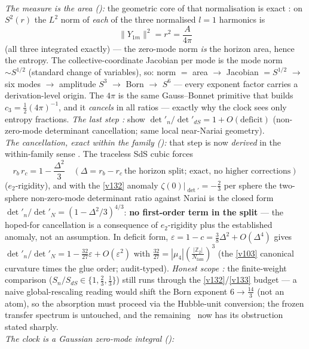 \documentclass[11pt,a4paper]{article}
\newcommand{\cthree}{c_3}
\newcommand{\Z}{\mathbb{Z}}
\newcommand{\Nfam}{N_{\mathrm{fam}}}
\begin{document}
\smallskip\\
\noindent\emph{The measure is the area ():} the geometric core of
that normalisation is exact \mE: on $S^2(r)$ the $L^2$ norm of \emph{each} of the three normalised
$l{=}1$ harmonics is
\[
  \boxed{\ \|Y_{1m}\|^2=r^2=\frac{A}{4\pi}\ }
\]
(all three integrated exactly) --- the zero-mode norm \emph{is} the horizon area, hence the entropy.
The collective-coordinate Jacobian per mode is the mode norm $\sim S^{1/2}$ (standard change of
variables), so: norm $=$ area $\to$ Jacobian $=S^{1/2}$ $\to$ six modes $\to$ amplitude $S^3$ $\to$
Born $\to$ $S^6$ --- every exponent factor carries a derivation-level origin. The $4\pi$ is the same
Gauss--Bonnet primitive that builds $\cthree=\tfrac12(4\pi)^{-1}$, and it \emph{cancels} in all
ratios --- exactly why the clock sees only entropy fractions. \emph{The last step \mC:} show
$\det'_n/\det'_{dS}=1+O(\text{deficit})$ (non-zero-mode determinant cancellation; same local
near-Nariai geometry). 
\smallskip\\
\noindent\emph{The cancellation, exact within the family ():} that step
is now \emph{derived} in the within-family sense \mE. The traceless SdS cubic forces
\[
  \boxed{\ r_b\,r_c=1-\frac{\Delta^2}{3}\quad(\Delta=r_b-r_c\ \text{the horizon split; exact, no higher
  corrections})\ }
\]
($e_2$-rigidity), and with the \vref{v132} anomaly $\zeta(0)|_{\det'}=-\tfrac23$ per sphere the
two-sphere non-zero-mode determinant ratio against Nariai is the closed form
$\det'_n/\det'_N=(1-\Delta^2/3)^{4/3}$: \textbf{no first-order term in the split} --- the hoped-for
cancellation is a consequence of $e_2$-rigidity plus the established anomaly, not an assumption. In
deficit form, $\varepsilon=1-c=\tfrac38\Delta^2+O(\Delta^4)$ gives
$\det'_n/\det'_N=1-\tfrac{32}{27}\varepsilon+O(\varepsilon^2)$ with
$\tfrac{32}{27}=|\mu_4|(\tfrac{|\Z_2|}{\Nfam})^3$ (the \vref{v103} canonical curvature times the glue
order; audit-typed). \emph{Honest scope \mC:} the finite-weight comparison
($S_n/S_{dS}\in\{1,\tfrac23,\tfrac13\}$) still runs through the \vref{v132}/\vref{v133} budget --- a naive
global-rescaling reading would shift the Born exponent $6\to\tfrac{14}3$ (not an atom), so the absorption
must proceed via the Hubble-unit conversion; the frozen transfer spectrum is untouched, and the remaining
\mC\ now has its obstruction stated sharply.
\smallskip\\
\noindent\emph{The clock is a Gaussian zero-mode integral ():}
\end{document}
